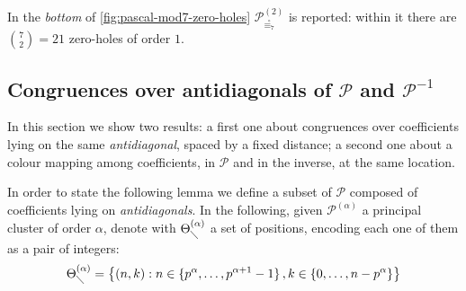 In the \emph{bottom} of \autoref{fig:pascal-mod7-zero-holes} 
$\mathcal{P}_{\stackrel{\circ}{\equiv_{7}}}^{(2)}$ is reported: within it there are
${{7}\choose{2}}=21$ zero-holes of order $1$.


\subsection{Congruences over antidiagonals of $\mathcal{P}$ and $\mathcal{P}^{-1}$}

In this section we show two results: a first one about congruences over coefficients
lying on the same \emph{antidiagonal}, spaced by a fixed distance; a second one
about a colour mapping among coefficients, in $\mathcal{P}$ and in the inverse,
at the same location.


\iffalse
\begin{corollary}
Let $\mathcal{P}$ be the Pascal array and let $p$ be a prime. Choose $k\in\mathbb{N}$, 
than $k$-th column is congruent to $k$-antidiagonal, modulo $p$.
\end{corollary}
\begin{proof}
    \begin{displaymath}
        \begin{split}
            { {n} \choose {k} } &\equiv_{p} { {n} \choose {n-k} } \\
            d_{nk} &\equiv_{p} d_{n,n-k}\\
            \sum_{n\geq 0}{d_{nk} t^n} &\equiv_{p}\sum_{n\geq 0}{d_{n,n-k} t^n} \\
            d(t)h(t)^k &\equiv_{p}\sum_{n\geq 0}{d_{n,n-k} t^n} \\
        \end{split}
    \end{displaymath}
no a standard form for antidiagonal exists, so on the right we leave the explicit
expression for the $k$-th antidiagonal.
\end{proof}
\fi

In order to state the following lemma we define a subset of $\mathcal{P}$
composed of coefficients lying on \emph{antidiagonals}. In the following, 
given $\mathcal{P}^{(\alpha)}$ a principal cluster of order $\alpha$, 
denote with $\Theta_{\diagdown}^{(\alpha)}$ a set of positions, encoding
each one of them as a pair of integers:
\begin{displaymath}
    \Theta_{\diagdown}^{(\alpha)}=\left\lbrace(n,k) : n\in\lbrace p^{\alpha},\ldots,p^{\alpha+1}-1\rbrace
        \,,k\in\lbrace0,\ldots,n-p^{\alpha}\rbrace    \right\rbrace
\end{displaymath}

